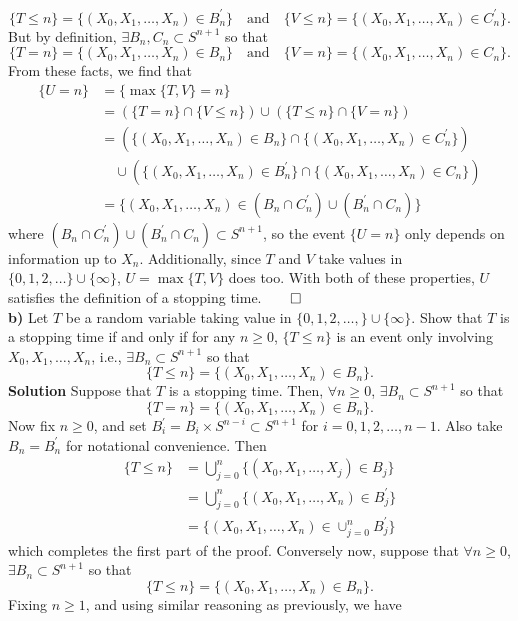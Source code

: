 \documentclass[11pt, letterpaper]{article}
\begin{document}
    \[\{T\leq n\}=\{(X_0,X_1,\dots,X_n)\in B^\prime_n\}\quad\text{and}\quad \{V\leq n\}=\{(X_0,X_1,\dots,X_n)\in C^\prime_n\}.\]
    But by definition, $\exists B_n,C_n\subset S^{n+1}$ so that
    \[\{T=n\}=\{(X_0,X_1,\dots,X_n)\in B_n\}\quad\text{and}\quad\{V=n\}=\{(X_0,X_1,\dots,X_n)\in C_n\}.\]
    From these facts, we find that
    \begin{align*}
        \{U=n\}&=\{\max\{T,V\}=n\}\\
        &=(\{T=n\}\cap\{V\leq n\})\cup(\{T\leq n\}\cap\{V=n\})\\
        &=(\{(X_0,X_1,\dots,X_n)\in B_n\}\cap\{(X_0,X_1,\dots,X_n)\in C_n^\prime\})\\
        &\quad\cup(\{(X_0,X_1,\dots,X_n)\in B_n^\prime\}\cap\{(X_0,X_1,\dots,X_n)\in C_n\})\\
        &=\{(X_0,X_1,\dots,X_n)\in (B_n\cap C_n^\prime)\cup(B_n^\prime\cap C_n)\}
    \end{align*}
    where $(B_n\cap C_n^\prime)\cup(B_n^\prime\cap C_n)\subset S^{n+1}$, so the event $\{U=n\}$ only depends on information up to $X_n$. Additionally, since $T$ and $V$ take values in $\{0,1,2,\dots\}\cup\{\infty\}$, $U=\max\{T,V\}$ does too. With both
    of these properties, $U$ satisfies the definition of a stopping time.\hfill{$\qed$}\\[10pt]
    {\bf b)} Let $T$ be a random variable taking value in $\{0,1,2,\dots,\}\cup\{\infty\}$. Show that $T$ is a stopping time if and only if for any $n\geq 0$, $\{T\leq n\}$ is an event only involving $X_0,X_1,\dots,X_n$, i.e., $\exists B_n\subset S^{n+1}$ so that
    \[\{T\leq n\}=\{(X_0,X_1,\dots,X_n)\in B_n\}.\]
    {\bf Solution} Suppose that $T$ is a stopping time. Then, $\forall n\geq 0$, $\exists B_n\subset S^{n+1}$ so that
    \[\{T= n\}=\{(X_0,X_1,\dots,X_n)\in B_n\}.\]
    Now fix $n\geq 0$, and set $B_i^\prime=B_i\times S^{n-i}\subset S^{n+1}$ for $i=0,1,2,\dots,n-1$. Also take $B_n=B_n^\prime$ for notational convenience. Then
    \begin{align*}
        \{T\leq n\}&=\bigcup_{j=0}^n\{(X_0,X_1,\dots,X_j)\in B_j\}\\
        &=\bigcup_{j=0}^n\{(X_0,X_1,\dots,X_n)\in B_j^\prime\}\\
        &=\{(X_0,X_1,\dots,X_n)\in\cup_{j=0}^n B_j^\prime\}
    \end{align*}
    which completes the first part of the proof. Conversely now, suppose that $\forall n\geq 0$, $\exists B_n\subset S^{n+1}$ so that
    \[\{T\leq n\}=\{(X_0,X_1,\dots,X_n)\in B_n\}.\]
    Fixing $n\geq 1$, and using similar reasoning as previously, we have
\end{document}
